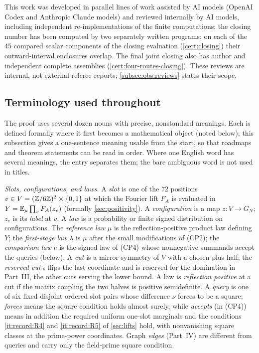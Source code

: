 This work was developed in parallel lines of work assisted by AI
models (OpenAI Codex and Anthropic Claude models) and reviewed
internally by AI models, including independent re-implementations of
the finite computations; the closing number has been computed by two
separately written programs; on each of the $45$ compared scalar
components of the closing evaluation (\cref{cert:closing}) their
outward-interval enclosures overlap. The final joint closing also has
author and independent complete assemblies
(\cref{cert:four-routes-closing}). These
reviews are internal, not external referee reports;
\cref{subsec:obs:reviews} states their scope.

\subsection{Terminology used throughout}\label{subsec:intro:glossary}

The proof uses several dozen nouns with precise, nonstandard meanings.
Each is defined formally where it first becomes a mathematical object
(noted below); this subsection gives a one-sentence meaning usable
from the start, so that roadmaps and theorem statements can be read
in order. Where one English word has several meanings, the entry
separates them; the bare ambiguous word is not used in titles.

\emph{Slots, configurations, and laws.}
A \emph{slot} is one of the $72$ positions
$v\in V=(\mathbb Z/6\mathbb Z)^2\times\{0,1\}$ at which the Fourier lift $F_A$ is
evaluated in $Y=\mathbb E_\mu\prod_vF_A(z_v)$ (formally \cref{sec:positivity}).
A \emph{configuration} is a map $z\colon V\to G_N$; $z_v$ is its
\emph{label} at $v$. A \emph{law} is a probability or finite signed
distribution on configurations. The \emph{reference law} $\mu$ is the
reflection-positive product law defining $Y$; the \emph{first-stage
law} $\lambda$ is $\mu$ after the small modifications of (CP2); the
\emph{comparison law} $\nu$ is the signed law of (CP4) whose
nonnegative summands accept the queries (below). A \emph{cut} is a
mirror symmetry of $V$ with a chosen plus half; the \emph{reserved
cut} $\iota$ flips the last coordinate and is reserved for the
domination in Part~III, the other cuts serving the lower bound.
A law is \emph{reflection positive} at a cut if the matrix coupling
the two halves is positive semidefinite.
A \emph{query} is one of six fixed disjoint ordered slot pairs whose
difference $\nu$ forces to be a square; \emph{forces} means the
square condition holds almost surely, while \emph{accepts} (in
(CP4)) means in addition the required uniform one-slot marginals and
the conditions \ref{it:record:R4} and \ref{it:record:R5} of
\cref{sec:lifts} hold, with nonvanishing square classes at
the
prime-power coordinates. Graph \emph{edges} (Part~IV) are different
from queries and carry only the field-prime square condition.

